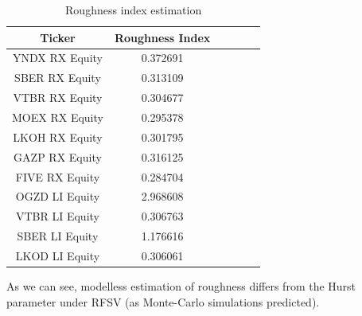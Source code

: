     \begin{table}[h]
        \centering
        \begin{tabular}{|c|c|c|c|c|c|}
            \hline
            Ticker &  Roughness Index\\\hline
            \hline
            YNDX RX Equity & 0.372691\\\hline
            SBER RX Equity & 0.313109\\\hline
            VTBR RX Equity & 0.304677\\\hline
            MOEX RX Equity & 0.295378\\\hline
            LKOH RX Equity & 0.301795\\\hline
            GAZP RX Equity & 0.316125\\\hline
            FIVE RX Equity & 0.284704\\\hline
            \hline
            OGZD LI Equity & 2.968608\\\hline
            VTBR LI Equity & 0.306763\\\hline
            SBER LI Equity & 1.176616\\\hline
            LKOD LI Equity & 0.306061\\\hline
        \end{tabular}
        \caption{Roughness index estimation}
        \label{tab:roughness_index}
    \end{table}

    As we can see, modelless estimation of roughness differs from the Hurst parameter under RFSV (as Monte-Carlo simulations predicted).
